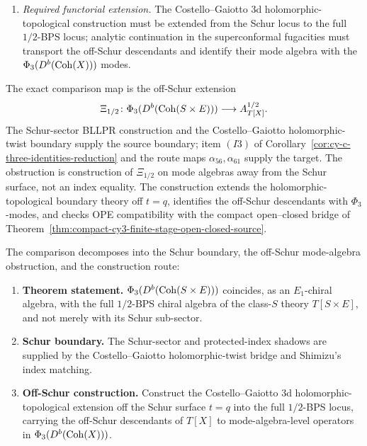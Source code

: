 \begin{theorem}
\begin{enumerate}[label=\textup{(E\arabic*)}]
 \item \emph{Required functorial extension.} The Costello--Gaiotto
 $3$d holomorphic-topological construction must be extended from the
 Schur locus to the full $1/2$-BPS locus; analytic continuation in the
 superconformal fugacities must transport the off-Schur descendants and
 identify their mode algebra with the $\Phi_3(D^b(\mathrm{Coh}(X)))$ modes.
\end{enumerate}
The exact comparison map is the off-Schur extension
\[
 \Xi_{1/2}\colon
 \Phi_3(D^b(\mathrm{Coh}(S\times E)))
 \longrightarrow A^{1/2}_{T[X]} .
\]
The Schur-sector BLLPR construction and the Costello--Gaiotto
holomorphic-twist boundary supply the source boundary; item $(I3)$ of
Corollary~\ref{cor:cy-c-three-identities-reduction} and the route maps
\(\alpha_{56},\alpha_{61}\) supply the target. The obstruction is
construction of \(\Xi_{1/2}\) on mode algebras away from the Schur
surface, not an index equality. The construction extends the
holomorphic-topological boundary theory off \(t=q\), identifies the
off-Schur descendants with \(\Phi_3\)-modes, and checks OPE
compatibility with the compact open--closed bridge of
Theorem~\ref{thm:compact-cy3-finite-stage-open-closed-source}.
\end{theorem}

\begin{remark}
\label{rem:conj-cy-c-i3-half-bps-triple}
The comparison decomposes into the Schur boundary, the off-Schur
mode-algebra obstruction, and the construction route:
\begin{enumerate}[label=\textup{(\alph*)}]
 \item \textbf{Theorem statement.} $\Phi_3(D^b(\mathrm{Coh}(S \times E)))$ coincides, as an $E_1$-chiral algebra, with the full $1/2$-BPS chiral algebra of the class-$S$ theory $T[S \times E]$, and not merely with its Schur sub-sector.
 \item \textbf{Schur boundary.} The Schur-sector and protected-index shadows are supplied by the Costello--Gaiotto holomorphic-twist bridge and Shimizu's index matching.
 \item \textbf{Off-Schur construction.} Construct the Costello--Gaiotto $3$d holomorphic-topological extension off the Schur surface $t = q$ into the full $1/2$-BPS locus, carrying the off-Schur descendants of $T[X]$ to mode-algebra-level operators in $\Phi_3(D^b(\mathrm{Coh}(X)))$.
\end{enumerate}
\end{remark}

